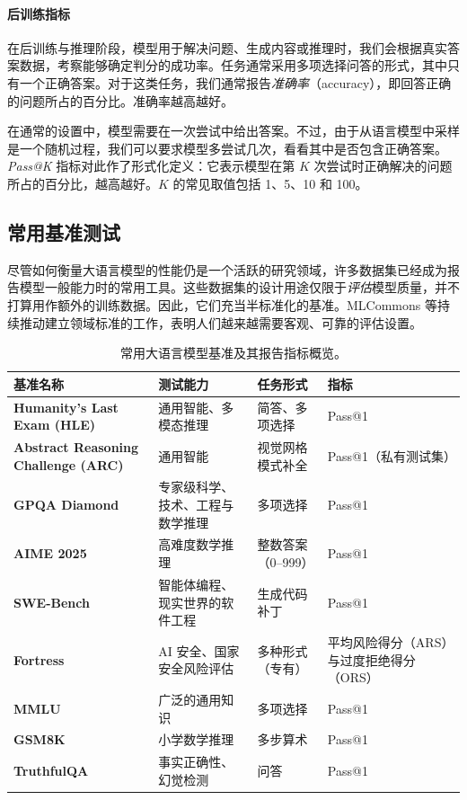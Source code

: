 \paragraph{后训练指标}
在后训练与推理阶段，模型用于解决问题、生成内容或推理时，我们会根据真实答案数据，考察能够确定判分的成功率。任务通常采用多项选择问答的形式，其中只有一个正确答案。对于这类任务，我们通常报告{\em 准确率}（accuracy），即回答正确的问题所占的百分比。准确率越高越好。

在通常的设置中，模型需要在一次尝试中给出答案。不过，由于从语言模型中采样是一个随机过程，我们可以要求模型多尝试几次，看看其中是否包含正确答案。{\em Pass@K} 指标对此作了形式化定义：它表示模型在第 $K$ 次尝试时正确解决的问题所占的百分比，越高越好。$K$ 的常见取值包括 1、5、10 和 100。

\subsection{常用基准测试}
尽管如何衡量大语言模型的性能仍是一个活跃的研究领域，许多数据集已经成为报告模型一般能力时的常用工具。这些数据集的设计用途仅限于{\em 评估}模型质量，并不打算用作额外的训练数据。因此，它们充当半标准化的基准。MLCommons \citep{thiyagalingam2022ai} 等持续推动建立领域标准的工作，表明人们越来越需要客观、可靠的评估设置。

\begin{table}[tb]
    \centering
    \setlength{\tabcolsep}{4pt}
    \begin{tabular}{@{}>{\raggedright\arraybackslash}p{}>{\raggedright\arraybackslash}p{}>{\raggedright\arraybackslash}p{}>{\raggedright\arraybackslash}p{}@{}}
        \toprule
        \textbf{基准名称} & \textbf{测试能力} & \textbf{任务形式} & \textbf{指标} \\
        \midrule
        \textbf{Humanity's Last Exam (HLE)} & 通用智能、多模态推理 & 简答、多项选择 & Pass@1 \\
        \textbf{Abstract Reasoning Challenge (ARC)} & 通用智能 & 视觉网格模式补全 & Pass@1（私有测试集） \\
        \textbf{GPQA Diamond} & 专家级科学、技术、工程与数学推理 & 多项选择 & Pass@1 \\
        \textbf{AIME 2025} & 高难度数学推理 & 整数答案（0--999） & Pass@1 \\
        \textbf{SWE-Bench} & 智能体编程、现实世界的软件工程 & 生成代码补丁 & Pass@1 \\
        \textbf{Fortress} & AI 安全、国家安全风险评估 & 多种形式（专有） & 平均风险得分（ARS）与过度拒绝得分（ORS） \\
        \textbf{MMLU} & 广泛的通用知识 & 多项选择 & Pass@1 \\
        \textbf{GSM8K} & 小学数学推理 & 多步算术 & Pass@1 \\
        \textbf{TruthfulQA} & 事实正确性、幻觉检测 & 问答 & Pass@1 \\
        \bottomrule
    \end{tabular}
    \caption{常用大语言模型基准及其报告指标概览。}
    \label{tab:llm-benchmarks}
\end{table}

